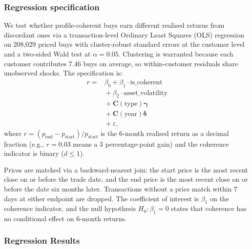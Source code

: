 \subsubsection{Regression specification}
We test whether profile-coherent buys earn different realised returns from discordant ones via a transaction-level Ordinary Least Squares (OLS) regression on 208{,}029 priced buys with cluster-robust standard errors at the customer level and a two-sided Wald test at $\alpha = 0.05$. Clustering is warranted because each customer contributes 7.46 buys on average, so within-customer residuals share unobserved shocks. The specification is:
\begin{equation}
\label{eq:return-premium-ols}
\begin{split}
r ={}& \beta_0 + \beta_1 \cdot \text{is\_coherent} \\
    &{}+ \beta_2 \cdot \text{asset\_volatility} \\
    &{}+ \mathbf{C}(\text{type})\boldsymbol{\gamma} \\
    &{}+ \mathbf{C}(\text{year})\boldsymbol{\delta} \\
    &{}+ \varepsilon,
\end{split}
\end{equation}
where $r = (p_{\text{end}} - p_{\text{start}})/p_{\text{start}}$ is the 6-month realised return as a decimal fraction (e.g., $r = 0.03$ means a 3 percentage-point gain) and the coherence indicator is binary ($d \leq 1$).

Prices are matched via a backward-nearest join: the start price is the most recent close on or before the trade date, and the end price is the most recent close on or before the date six months later. Transactions without a price match within 7 days at either endpoint are dropped. The coefficient of interest is $\beta_1$ on the coherence indicator, and the null hypothesis $H_0\colon \beta_1 = 0$ states that coherence has no conditional effect on 6-month returns.

\subsubsection{Regression Results}

